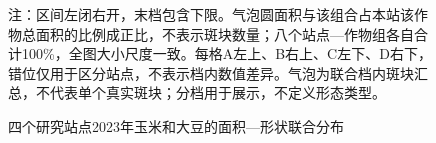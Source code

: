 \begin{figure}[!t]
\begin{minipage}{\textwidth}
\centering
\captionsetup{type=figure}

\caption{四个研究站点2023年玉米和大豆的面积—形状联合分布}
\label{fig:sec13_area_shape_joint}
\par\nointerlineskip\vspace{3pt}
{\songti\rmfamily{}\raggedright
注：区间左闭右开，末档包含下限。气泡圆面积与该组合占本站该作物总面积的比例成正比，不表示斑块数量；八个站点—作物组各自合计100\%，全图大小尺度一致。每格A左上、B右上、C左下、D右下，错位仅用于区分站点，不表示档内数值差异。气泡为联合档内斑块汇总，不代表单个真实斑块；分档用于展示，不定义形态类型。\par}
\end{minipage}
\end{figure}
